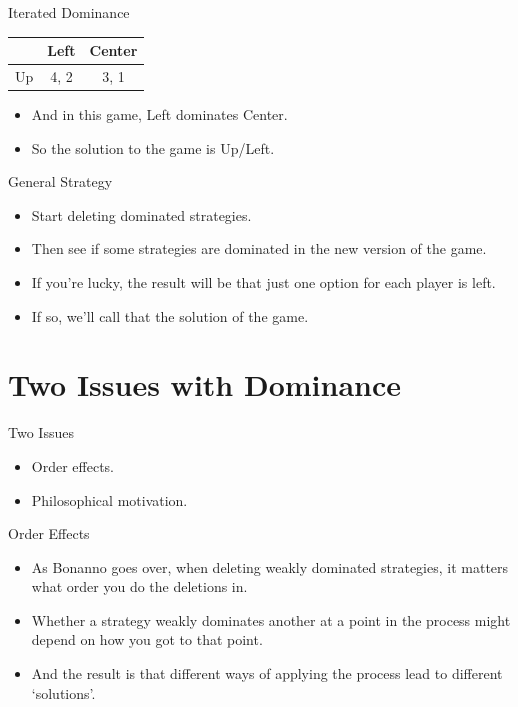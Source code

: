 \documentclass[
  14pt,
  letterpaper,
  ignorenonframetext,
  aspectratio=169,
]{beamer}
\providecommand{\tightlist}{%
  \setlength{\itemsep}{0pt}\setlength{\parskip}{0pt}}\usepackage{longtable,booktabs,array}
\let\olditem\item
\renewcommand{\item}{%
\olditem\vspace{6pt}}
\begin{document}
\begin{frame}{Iterated Dominance}
\protect\hypertarget{iterated-dominance-5}{}
\begin{table}[!h]
\centering
\begin{tabular}[t]{>{}r|cc}
\toprule
 & Left & Center\\
\midrule
Up & 4, 2 & 3, 1\\
\bottomrule
\end{tabular}
\end{table}

\begin{itemize}[<+->]
\tightlist
\item
  And in this game, Left dominates Center.
\item
  So the solution to the game is Up/Left.
\end{itemize}
\end{frame}

\begin{frame}{General Strategy}
\protect\hypertarget{general-strategy}{}
\begin{itemize}[<+->]
\tightlist
\item
  Start deleting dominated strategies.
\item
  Then see if some strategies are dominated in the new version of the
  game.
\item
  If you're lucky, the result will be that just one option for each
  player is left.
\item
  If so, we'll call that the solution of the game.
\end{itemize}
\end{frame}

\hypertarget{two-issues-with-dominance}{%
\section{Two Issues with Dominance}\label{two-issues-with-dominance}}

\begin{frame}{Two Issues}
\protect\hypertarget{two-issues}{}
\begin{itemize}[<+->]
\tightlist
\item
  Order effects.
\item
  Philosophical motivation.
\end{itemize}
\end{frame}

\begin{frame}{Order Effects}
\protect\hypertarget{order-effects}{}
\begin{itemize}[<+->]
\tightlist
\item
  As Bonanno goes over, when deleting weakly dominated strategies, it
  matters what order you do the deletions in.
\item
  Whether a strategy weakly dominates another at a point in the process
  might depend on how you got to that point.
\item
  And the result is that different ways of applying the process lead to
  different `solutions'.
\end{itemize}
\end{frame}
\end{document}
